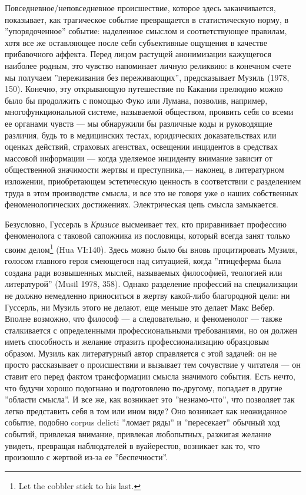 \documentclass[12pt]{book}
\begin{document}
Повседневное/неповседневное происшествие, которое здесь заканчивается, показывает, как трагическое событие превращается в статистическую норму, в ''упорядоченное'' событие: наделенное смыслом и соответствующее правилам, хотя все же оставляющее после себя субъективные ощущения в качестве прибавочного аффекта. Перед лицом растущей анонимизации кажущегося наиболее родным, это чувство напоминает личную реликвию: в конечном счете мы получаем ''переживания без переживающих'', предсказывает Музиль (1978, 150). Конечно, эту открывающую путешествие по Какании прелюдию можно было бы продолжить с помощью Фуко или Лумана, позволив, например, многофункциональной системе, называемой обществом, проявить себя со всеми ее органами чувств --- мы обнаружили бы различные коды и руководящие различия, будь то в медицинских тестах, юридических доказательствах или оценках действий, страховых агенствах, освещении инцидентов в средствах массовой информации --- когда уделяемое инциденту внимание зависит от общественной значимости жертвы и преступника,--- наконец, в литературном изложении, приобретающем эстетическую ценность в соответствии с разделением труда в этом производстве смысла, и все это не говоря уже о наших собственных феноменологических достижениях. Электрическая цепь смысла замыкается.

Безусловно, Гуссерль в \textit{Кризисе} высмеивает тех, кто приравнивает профессию феноменолога с таковой сапожника из пословицы, который всегда занят только своим делом\footnote{Let the cobbler stick to his last.} (Hua VI:140). Здесь можно было бы вновь процитировать Музиля, голосом главного героя смеющегося над ситуацией, когда ''птицеферма была создана ради возвышенных мыслей, называемых философией, теологией или литературой'' (Musil 1978, 358). Однако разделение профессий на специализации не должно немедленно приноситься в жертву какой-либо благородной цели: ни Гуссерль, ни Музиль этого не делают, еще меньше это делает Макс Вебер. Вполне возможно, что философ --- а следовательно, и феноменолог --- также сталкивается с определенными профессиональными требованиями, но он должен иметь способность и желание отразить профессионализацию образцовым образом. Музиль как литературный автор справляется с этой задачей: он не просто рассказывает о происшествии и вызывает тем сочувствие у читателя --- он ставит его перед фактом трансформации смысла значимого события. Есть нечто, что будучи хорошо подогнано и подготовлено по-другому, попадает в другие ''области смысла''. И все же, как возникает это ''незнамо-что'', что позволяет так легко представить себя в том или ином виде? Оно возникает как неожиданное событие, подобно corpus delicti ''ломает ряды'' и ''пересекает'' обычный ход событий, привлекая внимание, привлекая любопытных, разжигая желание увидеть, превращая наблюдателей в вуайерестов, возникает как то, что произошло с жертвой из-за ее ''беспечности''.
\end{document}

